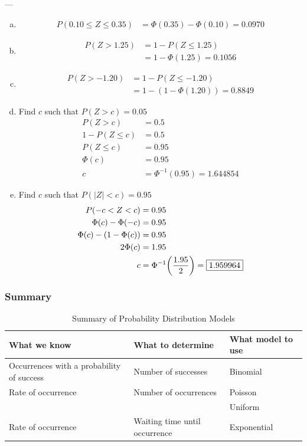\documentclass{report}
\DeclarePairedDelimiter\autobracket{(}{)}
\newcommand{\br}[1]{\autobracket*{#1}}
\begin{document}
---

\begin{enumerate}[(a)]
\item \begin{align*}
P(0.10 \leq Z \leq 0.35) & = \Phi(0.35) - \Phi(0.10) = \boxed{0.0970}
\end{align*}
\item \begin{align*}
P(Z > 1.25) & = 1 - P(Z \leq 1.25) \\ 
& = 1 - \Phi(1.25) = \boxed{0.1056}
\end{align*}
\item  \begin{align*}
P(Z > -1.20) & = 1 - P(Z \leq -1.20) \\ 
& = 1 - (1-\Phi(1.20)) = \boxed{0.8849}
\end{align*}
\item Find $c$ such that $P(Z > c) = 0.05$ \begin{align*}
P(Z > c) & = 0.5 \\
1 - P(Z \leq c) & = 0.5 \\
 P(Z \leq c)  & = 0.95 \\
 \Phi(c) & = 0.95  \\ 
c  & = \Phi^{-1}(0.95)  = \boxed{1.644854}
\end{align*}
\item Find $c$ such that $P(|Z| < c) = 0.95$
\begin{align*}
P(-c < Z < c) & = 0.95 \\
\Phi(c) - \Phi(-c) & = 0.95 \\
\Phi(c) - (1-\Phi(c)) & = 0.95 \\
2\Phi(c) & = 1.95 \\
c & = \Phi^{-1}\br{\frac{1.95}{2}} = \boxed{1.959964}
\end{align*}
\end{enumerate} 

\subsubsection{Summary}

\begin{table}[H]
\centering
\caption{Summary of Probability Distribution Models}
\small
\begin{tabular}{lll}
\toprule
 \textbf{What we know} & \textbf{What to determine} & \textbf{What model to use} \\
 \midrule
 Occurrences with a probability of success & Number of successes & Binomial \\
  Rate of occurrence & Number of occurrences & Poisson \\
   &  & Uniform \\

  Rate of occurrence  & Waiting time until occurrence & Exponential \\

  \bottomrule
\end{tabular}
\end{table}
\end{document}
